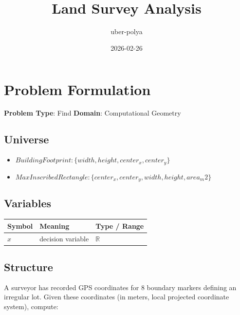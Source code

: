 \documentclass[11pt, a4paper]{article}
\title{Land Survey Analysis}
\author{uber-polya}
\date{2026-02-26}
\begin{document}
\maketitle
\tableofcontents
\newpage

\section{Problem Formulation}

\begin{polyamodel}

\textbf{Problem Type}: Find \hfill
\textbf{Domain}: Computational Geometry


\end{polyamodel}

\subsection{Universe}

\begin{itemize}
  \item $Building Footprint: \{width, height, center_x, center_y\}$
  \item $Max Inscribed Rectangle: \{center_x, center_y, width, height, area_m2\}$
\end{itemize}

\subsection{Variables}

\begin{longtable}{lll}
\toprule
\textbf{Symbol} & \textbf{Meaning} & \textbf{Type / Range} \\
\midrule
\endhead
$x$ & decision variable & $\mathbb{{R}}$ \\
\bottomrule
\end{longtable}

\subsection{Structure}

A surveyor has recorded GPS coordinates for 8 boundary markers defining an irregular lot. Given these coordinates (in meters, local projected coordinate system), compute:
\end{document}
